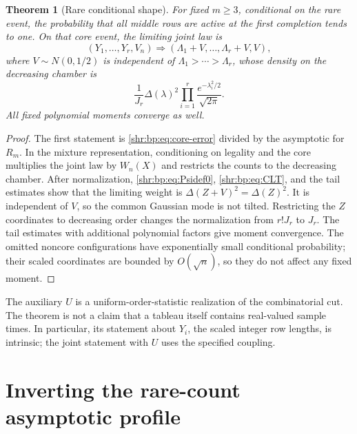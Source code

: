 \documentclass[11pt,letterpaper]{article}
\numberwithin{equation}{section}
\newtheorem{theorem}{Theorem}[section]
\theoremstyle{definition}
\newcommand{\1}{\mathbf 1}
\begin{document}
\begin{theorem}[Rare conditional shape]
\label{shr:bp:thm:shape}
For fixed $m\ge3$, conditional on the rare event, the probability that all
middle rows are active at the first completion tends to one. On that
core event, the limiting joint law is
\begin{equation}
 (Y_1,\ldots,Y_r,V_n)\Rightarrow
 (\Lambda_1+V,\ldots,\Lambda_r+V,V),
 \label{shr:bp:eq:shape}
\end{equation}
where $V\sim N(0,1/2)$ is independent of
$\Lambda_1>\cdots>\Lambda_r$, whose density on the decreasing chamber is
\begin{equation}
 \frac1{J_r}\Delta(\lambda)^2
 \prod_{i=1}^r\frac{e^{-\lambda_i^2/2}}{\sqrt{2\pi}}.
 \label{shr:bp:eq:orderedGaussian}
\end{equation}
All fixed polynomial moments converge as well.
\end{theorem}
\begin{proof}
The first statement is \eqref{shr:bp:eq:core-error} divided by the asymptotic
for $R_m$. In the mixture representation, conditioning on legality and
the core multiplies the joint law by $W_n(X)$ and restricts the counts to
the decreasing chamber. After normalization,
\eqref{shr:bp:eq:Psidef0}, \eqref{shr:bp:eq:CLT}, and the tail estimates show that the
limiting weight is $\Delta(Z+V)^2=\Delta(Z)^2$. It is independent of $V$,
so the common Gaussian mode is not tilted. Restricting the $Z$ coordinates
to decreasing order changes the normalization from $r!J_r$ to $J_r$.
The tail estimates with additional polynomial factors give moment
convergence. The omitted noncore configurations have exponentially small
conditional probability; their scaled coordinates are bounded by
$O(\sqrt n)$, so they do not affect any fixed moment.
\end{proof}

The auxiliary $U$ is a uniform-order-statistic realization of the
combinatorial cut. The theorem is not a claim that a tableau itself
contains real-valued sample times. In particular, its statement about
$Y_i$, the scaled integer row lengths, is intrinsic; the joint statement
with $U$ uses the specified coupling.

\section{Inverting the rare-count asymptotic profile}
\label{shr:bp:sec:inverse}
\end{document}
